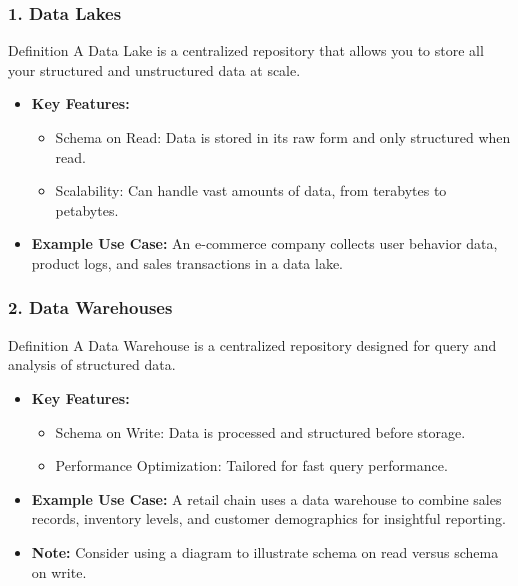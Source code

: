 \documentclass[aspectratio=169]{beamer}
\begin{document}
\begin{frame}[fragile]
    \frametitle{1. Data Lakes}
    \begin{block}{Definition}
        A Data Lake is a centralized repository that allows you to store all your structured and unstructured data at scale.
    \end{block}
    \begin{itemize}
        \item \textbf{Key Features:}
        \begin{itemize}
            \item Schema on Read: Data is stored in its raw form and only structured when read.
            \item Scalability: Can handle vast amounts of data, from terabytes to petabytes.
        \end{itemize}
        \item \textbf{Example Use Case:} An e-commerce company collects user behavior data, product logs, and sales transactions in a data lake.
    \end{itemize}
\end{frame}

\begin{frame}[fragile]
    \frametitle{2. Data Warehouses}
    \begin{block}{Definition}
        A Data Warehouse is a centralized repository designed for query and analysis of structured data.
    \end{block}
    \begin{itemize}
        \item \textbf{Key Features:}
        \begin{itemize}
            \item Schema on Write: Data is processed and structured before storage.
            \item Performance Optimization: Tailored for fast query performance.
        \end{itemize}
        \item \textbf{Example Use Case:} A retail chain uses a data warehouse to combine sales records, inventory levels, and customer demographics for insightful reporting.
        \item \textbf{Note:} Consider using a diagram to illustrate schema on read versus schema on write.
    \end{itemize}
\end{frame}
\end{document}
